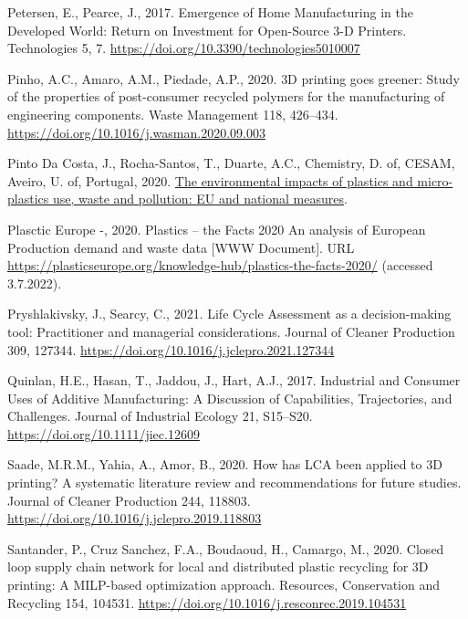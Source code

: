 \documentclass[12pt]{elsarticle} %
\newlength{\cslhangindent}
\newlength{\cslentryspacingunit} %
\newenvironment{CSLReferences}[2] %
 {%
  \setlength{\parindent}{0pt}
  \ifodd #1
  \let\oldpar\par
  \def\par{\hangindent=\cslhangindent\oldpar}
  \fi
  \setlength{\parskip}{#2\cslentryspacingunit}
 }%
 {}
\begin{document}
\begin{CSLReferences}{1}{0}
\leavevmode{}%
Petersen, E., Pearce, J., 2017. Emergence of {Home Manufacturing} in the {Developed World}: {Return} on {Investment} for {Open-Source} 3-{D Printers}. Technologies 5, 7. \url{https://doi.org/10.3390/technologies5010007}

\leavevmode{}%
Pinho, A.C., Amaro, A.M., Piedade, A.P., 2020. {3D} printing goes greener: {Study} of the properties of post-consumer recycled polymers for the manufacturing of engineering components. Waste Management 118, 426--434. \url{https://doi.org/10.1016/j.wasman.2020.09.003}

\leavevmode{}%
Pinto Da Costa, J., Rocha-Santos, T., Duarte, A.C., Chemistry, D. of, CESAM, Aveiro, U. of, Portugal, 2020. \href{https://policycommons.net/artifacts/1426661/the-environmental-impacts-of-plastics-and-micro-plastics-use-waste-and-pollution/2041108/}{The environmental impacts of plastics and micro-plastics use, waste and pollution: {EU} and national measures}.

\leavevmode{}%
Plasctic Europe -, 2020. Plastics -- the {Facts} 2020 {An} analysis of {European Production} demand and waste data {[}WWW Document{]}. URL \url{https://plasticseurope.org/knowledge-hub/plastics-the-facts-2020/} (accessed 3.7.2022).

\leavevmode{}%
Pryshlakivsky, J., Searcy, C., 2021. Life {Cycle Assessment} as a decision-making tool: {Practitioner} and managerial considerations. Journal of Cleaner Production 309, 127344. \url{https://doi.org/10.1016/j.jclepro.2021.127344}

\leavevmode{}%
Quinlan, H.E., Hasan, T., Jaddou, J., Hart, A.J., 2017. Industrial and {Consumer Uses} of {Additive Manufacturing}: {A Discussion} of {Capabilities}, {Trajectories}, and {Challenges}. Journal of Industrial Ecology 21, S15--S20. \url{https://doi.org/10.1111/jiec.12609}

\leavevmode{}%
Saade, M.R.M., Yahia, A., Amor, B., 2020. How has {LCA} been applied to {3D} printing? {A} systematic literature review and recommendations for future studies. Journal of Cleaner Production 244, 118803. \url{https://doi.org/10.1016/j.jclepro.2019.118803}

\leavevmode{}%
Santander, P., Cruz Sanchez, F.A., Boudaoud, H., Camargo, M., 2020. Closed loop supply chain network for local and distributed plastic recycling for {3D} printing: A {MILP-based} optimization approach. Resources, Conservation and Recycling 154, 104531. \url{https://doi.org/10.1016/j.resconrec.2019.104531}


\end{CSLReferences}
\end{document}
